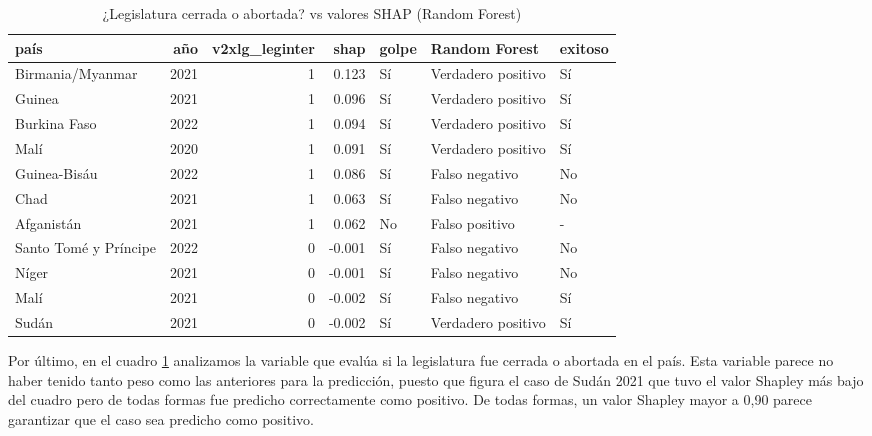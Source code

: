 \documentclass{article}
\begin{document}
\begin{table}[H]
 \centering
 \begin{tabular}{lrrrlll}
  \toprule
  país & año & v2xlg\_leginter & shap & golpe & Random Forest & exitoso \\
  \midrule
  Birmania/Myanmar & 2021 & 1 & 0.123 & Sí & Verdadero positivo & Sí \\
  Guinea & 2021 & 1 & 0.096 & Sí & Verdadero positivo & Sí \\
  Burkina Faso & 2022 & 1 & 0.094 & Sí & Verdadero positivo & Sí \\
  Malí & 2020 & 1 & 0.091 & Sí & Verdadero positivo & Sí \\
  Guinea-Bisáu & 2022 & 1 & 0.086 & Sí & Falso negativo & No \\
  Chad & 2021 & 1 & 0.063 & Sí & Falso negativo & No \\
  Afganistán & 2021 & 1 & 0.062 & No & Falso positivo & - \\
  Santo Tomé y Príncipe & 2022 & 0 & -0.001 & Sí & Falso negativo & No \\
  Níger & 2021 & 0 & -0.001 & Sí & Falso negativo & No \\
  Malí & 2021 & 0 & -0.002 & Sí & Falso negativo & Sí \\
  Sudán & 2021 & 0 & -0.002 & Sí & Verdadero positivo & Sí \\
  \bottomrule
  \end{tabular}
\caption{¿Legislatura cerrada o abortada? vs valores SHAP (Random Forest) \label{tab:shap_rf_leginter}}
\end{table}

Por último, en el cuadro \ref{tab:shap_rf_leginter} analizamos la variable que evalúa si la legislatura 
fue cerrada o abortada en el país. Esta variable parece no haber tenido tanto peso como las anteriores 
para la predicción, puesto que figura el caso de Sudán 2021 que tuvo el valor Shapley más bajo del 
cuadro pero de todas formas fue predicho correctamente como positivo. De todas formas, un valor Shapley
mayor a 0,90 parece garantizar que el caso sea predicho como positivo.
\end{document}
